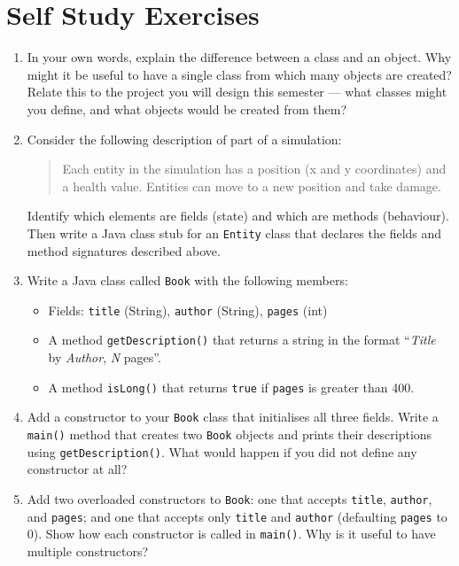 \documentclass[twoside=false,DIV=14]{scrartcl}
\begin{document}
\section*{Self Study Exercises}
\begin{enumerate}

\item In your own words, explain the difference between a class and an object.  Why might it be useful to have a single class from which many objects are created?  Relate this to the project you will design this semester --- what classes might you define, and what objects would be created from them?

\item Consider the following description of part of a simulation:

\begin{quote}
Each entity in the simulation has a position (x and y coordinates) and a health value.  Entities can move to a new position and take damage.
\end{quote}

Identify which elements are fields (state) and which are methods (behaviour).  Then write a Java class stub for an \texttt{Entity} class that declares the fields and method signatures described above.

\item Write a Java class called \texttt{Book} with the following members:
\begin{itemize}
    \item Fields: \texttt{title} (String), \texttt{author} (String), \texttt{pages} (int)
    \item A method \texttt{getDescription()} that returns a string in the format ``\textit{Title} by \textit{Author}, \textit{N} pages''.
    \item A method \texttt{isLong()} that returns \texttt{true} if \texttt{pages} is greater than 400.
\end{itemize}

\item Add a constructor to your \texttt{Book} class that initialises all three fields.  Write a \texttt{main()} method that creates two \texttt{Book} objects and prints their descriptions using \texttt{getDescription()}.  What would happen if you did not define any constructor at all?

\item Add two overloaded constructors to \texttt{Book}: one that accepts \texttt{title}, \texttt{author}, and \texttt{pages}; and one that accepts only \texttt{title} and \texttt{author} (defaulting \texttt{pages} to 0).  Show how each constructor is called in \texttt{main()}.  Why is it useful to have multiple constructors?


\end{enumerate}
\end{document}
